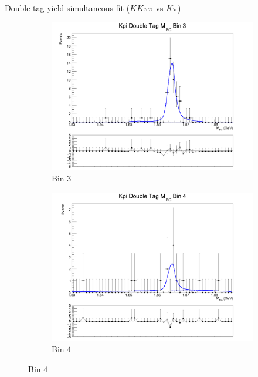 \documentclass{beamer}
\begin{document}
\begin{frame}{Double tag yield simultaneous fit ($KK\pi\pi$ vs $K\pi$)}
\begin{figure}
    \begin{subfigure}{0.38\textwidth}
      \centering
      \includegraphics[width=\textwidth]{Plots/DoubleTagYield_DoubleTag_Flavour_KKpipi_vs_Kpi_SignalBinP3_TagBin0.png}
      \caption{Bin $3$}
    \end{subfigure}%
    \begin{subfigure}{0.38\textwidth}
      \centering
      \includegraphics[width=\textwidth]{Plots/DoubleTagYield_DoubleTag_Flavour_KKpipi_vs_Kpi_SignalBinP4_TagBin0.png}
      \caption{Bin $4$}
    \end{subfigure}
  \end{figure}
\end{frame}
\end{document}
